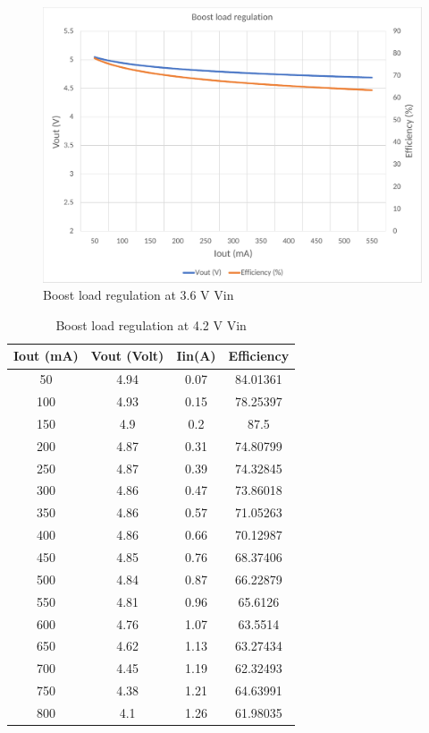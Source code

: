 \begin{figure}[H]
	\centering
	\includegraphics[width=0.9\columnwidth]{IMGS/Boost load regulation at 3.6V Vin.pdf}
	\caption{Boost load regulation at 3.6 V Vin}
	\label{fig:arch}
\end{figure}
\begin{table}[H]
\centering
\begin{tabular}{c c c c}
\toprule
Iout (mA) & Vout (Volt) & Iin(A) & Efficiency \\ \midrule\midrule
50        & 4.94        & 0.07   & 84.01361   \\ 
100       & 4.93        & 0.15   & 78.25397   \\ 
150       & 4.9         & 0.2    & 87.5       \\ 
200       & 4.87        & 0.31   & 74.80799   \\ 
250       & 4.87        & 0.39   & 74.32845   \\ 
300       & 4.86        & 0.47   & 73.86018   \\ 
350       & 4.86        & 0.57   & 71.05263   \\ 
400       & 4.86        & 0.66   & 70.12987   \\ 
450       & 4.85        & 0.76   & 68.37406   \\ 
500       & 4.84        & 0.87   & 66.22879   \\ 
550       & 4.81        & 0.96   & 65.6126    \\ 
600       & 4.76        & 1.07   & 63.5514    \\ 
650       & 4.62        & 1.13   & 63.27434   \\ 
700       & 4.45        & 1.19   & 62.32493   \\ 
750       & 4.38        & 1.21   & 64.63991   \\ 
800       & 4.1         & 1.26   & 61.98035   \\ \bottomrule
\end{tabular}
\caption{Boost load regulation at 4.2 V Vin}
\label{table:4}
\end{table}
